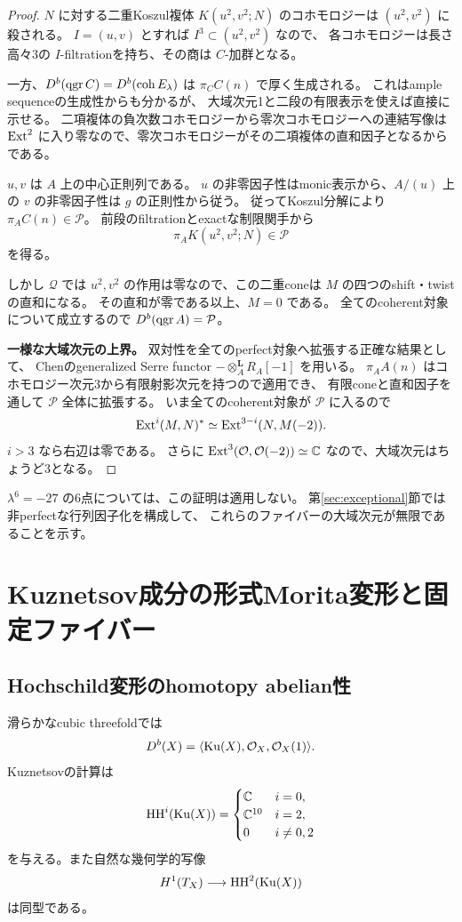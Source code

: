 \begin{proof}
$N$ に対する二重Koszul複体 $K(u^2,v^2;N)$ のコホモロジーは
$(u^2,v^2)$ に殺される。
$I=(u,v)$ とすれば $I^3\subset(u^2,v^2)$ なので、
各コホモロジーは長さ高々3の $I$-filtrationを持ち、その商は $C$-加群となる。

一方、$D^b(\operatorname{qgr} C)=D^b(\operatorname{coh}E_\lambda)$ は $\pi_CC(n)$ で厚く生成される。
これはample sequenceの生成性からも分かるが、
大域次元1と二段の有限表示を使えば直接に示せる。
二項複体の負次数コホモロジーから零次コホモロジーへの連結写像は
$\operatorname{Ext}^2$ に入り零なので、零次コホモロジーがその二項複体の直和因子となるからである。

$u,v$ は $A$ 上の中心正則列である。
$u$ の非零因子性はmonic表示から、$A/(u)$ 上の $v$ の非零因子性は $g$ の正則性から従う。
従ってKoszul分解により $\pi_A C(n)\in\mathcal P$。
前段のfiltrationとexactな制限関手から
\[
 \pi_AK(u^2,v^2;N)\in\mathcal P
\]
を得る。

しかし $\mathcal Q$ では $u^2,v^2$ の作用は零なので、この二重coneは
$M$ の四つのshift・twistの直和になる。
その直和が零である以上、$M=0$ である。
全てのcoherent対象について成立するので $D^b(\operatorname{qgr} A)=\mathcal P$。

\textbf{一様な大域次元の上界。}
双対性を全てのperfect対象へ拡張する正確な結果として、
Chen\cite[Theorem 3.10]{Chen}のgeneralized Serre functor
$-\otimes_A^{\mathbf L}R_A[-1]$ を用いる。
$\pi_A A(n)$ はコホモロジー次元3から有限射影次元を持つので適用でき、
有限coneと直和因子を通して $\mathcal P$ 全体に拡張する。
いま全てのcoherent対象が $\mathcal P$ に入るので
\[
 \operatorname{Ext}^i(M,N)^*\simeq\operatorname{Ext}^{3-i}(N,M(-2)).
\]
$i>3$ なら右辺は零である。
さらに $\operatorname{Ext}^3(\mathcal O,\mathcal O(-2))\simeq\mathbb C$ なので、大域次元はちょうど3となる。
\end{proof}

$\lambda^6=-27$ の6点については、この証明は適用しない。
第\ref{sec:exceptional}節では非perfectな行列因子化を構成して、
これらのファイバーの大域次元が無限であることを示す。

\section{Kuznetsov成分の形式Morita変形と固定ファイバー}

\subsection{Hochschild変形のhomotopy abelian性}

滑らかなcubic threefoldでは
\[
 D^b(X)=\langle\operatorname{Ku}(X),\mathcal O_X,\mathcal O_X(1)\rangle.
\]
Kuznetsovの計算\cite[Theorem 8.9]{Kuz}は
\[
 \operatorname{HH}^i(\operatorname{Ku}(X))=
 \begin{cases}
 \mathbb C&i=0,\\
 \mathbb C^{10}&i=2,\\
 0&i\ne0,2
 \end{cases}
\]
を与える。また自然な幾何学的写像
\[
 H^1(T_X)\longrightarrow\operatorname{HH}^2(\operatorname{Ku}(X))
\]
は同型である\cite[Theorem 4.4(2)]{JLLZ}。

